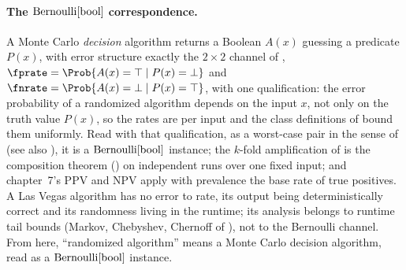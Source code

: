 \paragraph{The $\mathrm{Bernoulli}[\mathrm{bool}]$ correspondence.}
A Monte Carlo \emph{decision} algorithm returns a Boolean $A(x)$ guessing a
predicate $P(x)$, with error structure exactly the $2 \times 2$ channel of
, $\fprate = \Prob{A(x) = \top \mid P(x) = \bot}$ and
$\fnrate = \Prob{A(x) = \bot \mid P(x) = \top}$, with one qualification: the
error probability of a randomized algorithm depends on the input $x$, not only
on the truth value $P(x)$, so the rates are per input and the class
definitions of  bound them uniformly. Read with that
qualification, as a worst-case pair in the sense of
 (see also ), it is a
$\mathrm{Bernoulli}[\mathrm{bool}]$ instance; the $k$-fold amplification of
 is the composition theorem
() on independent runs over one fixed input; and
chapter~7's PPV and NPV apply with prevalence the base rate of true positives. A Las Vegas algorithm
has no error to rate, its output being deterministically correct and its
randomness living in the runtime; its analysis belongs to runtime tail bounds
(Markov, Chebyshev, Chernoff of ), not to the
Bernoulli channel. From here, ``randomized algorithm'' means a Monte Carlo
decision algorithm, read as a $\mathrm{Bernoulli}[\mathrm{bool}]$ instance.
